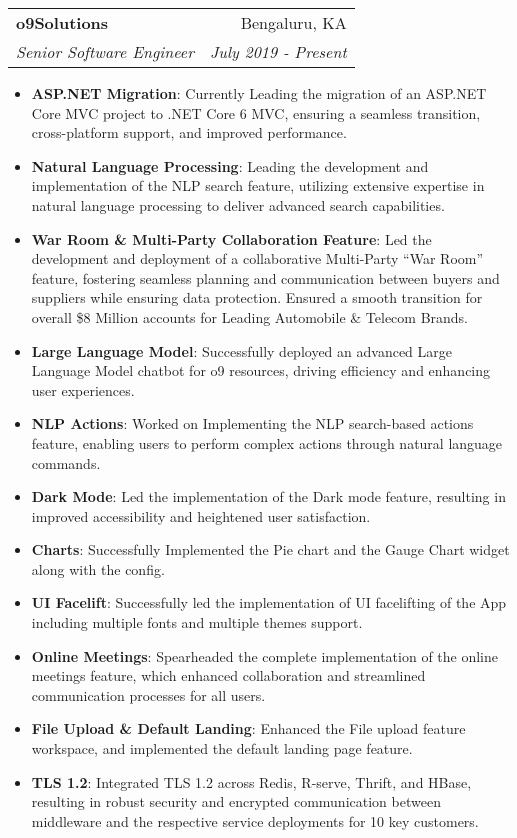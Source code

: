 \documentclass[letterpaper,11pt]{article}
\makeatletter
\newcommand{\resumeItem}[2]{
  \item\small{
    \textbf{#1}{: #2 \vspace{-2pt}}
  }
}
\newcommand{\resumeSubheading}[4]{
  \vspace{-1pt}\item
    \begin{tabular*}{0.97\textwidth}[t]{l@{\extracolsep{\fill}}r}
      \textbf{#1} & #2 \\
      \textit{\small#3} & \textit{\small #4} \\
    \end{tabular*}\vspace{-5pt}
}
\newcommand{\resumeSubSubheading}[2]{
    \begin{tabular*}{0.97\textwidth}{l@{\extracolsep{\fill}}r}
      \textit{\small#1} & \textit{\small #2} \\
    \end{tabular*}\vspace{-5pt}
}
\newcommand{\resumeSubHeadingListEnd}{\end{itemize}}
\newcommand{\resumeItemListStart}{\begin{itemize}}
\newcommand{\resumeItemListEnd}{\end{itemize}\vspace{-5pt}}
\makeatother
\begin{document}
    \resumeSubheading
      {o9Solutions}{Bengaluru, KA}
      {Senior Software Engineer}{July 2019 - Present}
      \resumeItemListStart
      \resumeItem{ASP.NET Migration}
          {Currently Leading the migration of an ASP.NET Core MVC project to .NET Core 6 MVC, ensuring a seamless transition, cross-platform support, and improved performance.}
        \resumeItem{Natural Language Processing}
          {Leading the development and implementation of the NLP
search feature, utilizing extensive expertise in natural language
processing to deliver advanced search capabilities.}
        \resumeItem{War Room \& Multi-Party Collaboration Feature}
          {Led the development and deployment of a collaborative Multi-Party “War Room” feature, fostering seamless planning and communication between buyers and suppliers while ensuring data protection. Ensured a smooth transition for overall \$8 Million accounts for Leading Automobile \& Telecom Brands. }
        \resumeItem{Large Language Model}
          {Successfully deployed an advanced Large Language Model chatbot for
o9 resources, driving efficiency and enhancing user experiences.}
         \resumeItem{NLP Actions}
          {Worked on Implementing the NLP search-based actions feature,
enabling users to perform complex actions through natural language
commands.}
        \resumeItem{Dark Mode}
          {Led the implementation of the Dark mode feature, resulting in
improved accessibility and heightened user satisfaction.}
        \resumeItem{Charts}
          {Successfully Implemented the Pie chart and the Gauge Chart widget
along with the config.}
        \resumeItem{UI Facelift}
          {Successfully led the implementation of UI facelifting of the App
including multiple fonts and multiple themes support.}
        \resumeItem{Online Meetings}
          {Spearheaded the complete implementation of the online meetings
feature, which enhanced collaboration and streamlined
communication processes for all users.}
         \resumeItem{File Upload \& Default Landing}
            {Enhanced the File upload feature workspace, and implemented the default landing page feature.}
        \resumeItem{TLS 1.2}
         {Integrated TLS 1.2 across Redis, R-serve, Thrift, and HBase, resulting in robust security and encrypted communication between middleware and the respective service deployments for 10 key customers.}
        
      \resumeItemListEnd
      
\end{document}
